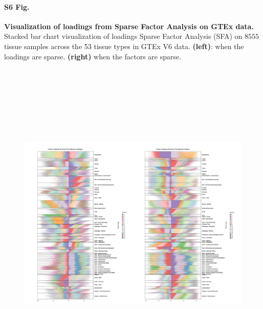 \documentclass[10pt,letterpaper]{article}
\begin{document}
\paragraph*{S6 Fig.}

\label{figS6}
{\bf Visualization of loadings from Sparse Factor Analysis on GTEx data.} Stacked bar chart visualization of loadings Sparse Factor Analysis (SFA) on $8555$ tissue samples
across the 53 tissue types in GTEx V6 data. \textbf{(left)}: when the loadings are sparse. \textbf{(right)} when the factors are sparse.
\begin{figure}[ht]
\centering
\includegraphics[height=6.3in, width=7in]{../../plots/gtex-figures/sfa_gtex_figs.png}
\end{figure}
\end{document}
